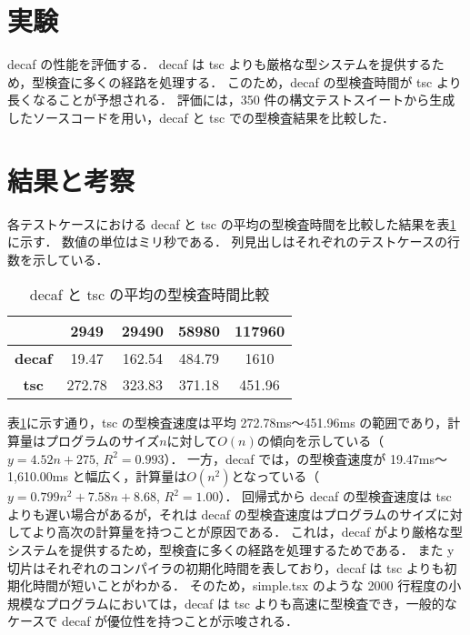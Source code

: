 \documentclass[11pt,twocolumn]{classes/yokou}
\begin{document}
\section{実験}

decaf の性能を評価する．
decaf は tsc よりも厳格な型システムを提供するため，型検査に多くの経路を処理する．
このため，decaf の型検査時間が tsc より長くなることが予想される．
評価には，350 件の構文テストスイートから生成したソースコードを用い，decaf と tsc での型検査結果を比較した．

\section{結果と考察}

各テストケースにおける decaf と tsc の平均の型検査時間を比較した結果を表\ref{tab:comparison} に示す．
数値の単位はミリ秒である．
列見出しはそれぞれのテストケースの行数を示している．

\begin{table}[h]
	\caption{decaf と tsc の平均の型検査時間比較}
	\begin{tabular}{|c|c|c|c|c|}
		\hline
		               & \textbf{2949} & \textbf{29490} & \textbf{58980} & \textbf{117960} \\ \hline
		\textbf{decaf} & 19.47         & 162.54         & 484.79         & 1610            \\ \hline
		\textbf{tsc}   & 272.78        & 323.83         & 371.18         & 451.96          \\ \hline
	\end{tabular}
	\label{tab:comparison}
\end{table}

表\ref{tab:comparison}に示す通り，tsc の型検査速度は平均 272.78ms〜451.96ms の範囲であり，計算量はプログラムのサイズ$n$に対して$O(n)$の傾向を示している（$y = 4.52n + 275$, $R^2 = 0.993$）．
一方，decaf では，の型検査速度が 19.47ms〜1,610.00ms と幅広く，計算量は$O(n^2)$となっている（$y = 0.799n^2 + 7.58n + 8.68$, $R^2 = 1.00$）．
回帰式から decaf の型検査速度は tsc よりも遅い場合があるが，それは decaf の型検査速度はプログラムのサイズに対してより高次の計算量を持つことが原因である．
これは，decaf がより厳格な型システムを提供するため，型検査に多くの経路を処理するためである．
また y 切片はそれぞれのコンパイラの初期化時間を表しており，decaf は tsc よりも初期化時間が短いことがわかる．
そのため，simple.tsx のような 2000 行程度の小規模なプログラムにおいては，decaf は tsc よりも高速に型検査でき，一般的なケースで decaf が優位性を持つことが示唆される．
\end{document}
